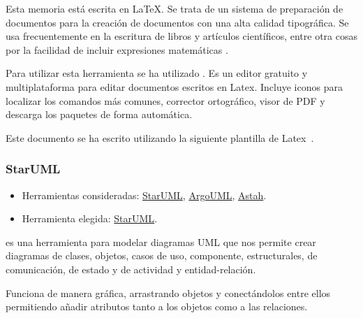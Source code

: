 Esta memoria está escrita en \LaTeX. Se trata de un sistema de preparación de documentos para la creación de documentos con una alta calidad tipográfica. Se usa frecuentemente en la escritura de libros y artículos científicos, entre otra cosas por la facilidad de incluir expresiones matemáticas \cite{wiki:latex} \cite{wiki:latexwikibooks}.

Para utilizar esta herramienta se ha utilizado . Es un editor gratuito y multiplataforma para editar documentos escritos en Latex. Incluye iconos para localizar los comandos más comunes, corrector ortográfico, visor de PDF y descarga los paquetes de forma automática.

Este documento se ha escrito utilizando la siguiente plantilla de Latex~\cite{misc:plantillalatex}.

\subsubsection{StarUML}

\begin{itemize}
	\tightlist
	\item
	Herramientas consideradas:
	\href{http://staruml.io/}{StarUML}, 
	\href{http://argouml.tigris.org/}{ArgoUML},
	\href{http://astah.net/}{Astah}.
	\item
	Herramienta elegida:
	\href{http://staruml.io/}{StarUML}.
\end{itemize}

 es una herramienta para modelar diagramas UML que nos permite crear diagramas de clases, objetos, casos de uso, componente, estructurales, de comunicación, de estado y de actividad y entidad-relación.

Funciona de manera gráfica, arrastrando objetos y conectándolos entre ellos permitiendo añadir atributos tanto a los objetos como a las relaciones.
